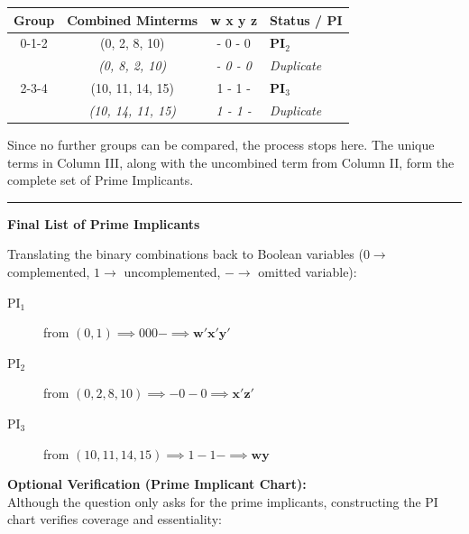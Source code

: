 \documentclass[12pt,a3paper]{article}
\begin{document}
\begin{enumerate}
\begin{tcolorbox}[enhanced,breakable,ansbox,colback=cC!4,colframe=cC,boxrule=0.8pt,arc=5pt,title={\textbf{Answer}},fonttitle=\bfseries\color{white},colbacktitle=cC]
\begin{center}
\begin{tabular}{cccl}
\toprule
\textbf{Group} & \textbf{Combined Minterms} & \textbf{w x y z} & \textbf{Status / PI} \\
\midrule
0-1-2 & (0, 2, 8, 10) & - 0 - 0 & \textcolor{cC}{\textbf{PI$_2$}} \\
      & \textit{(0, 8, 2, 10)} & \textit{- 0 - 0} & \textit{Duplicate} \\
\midrule
2-3-4 & (10, 11, 14, 15) & 1 - 1 - & \textcolor{cC}{\textbf{PI$_3$}} \\
      & \textit{(10, 14, 11, 15)} & \textit{1 - 1 -} & \textit{Duplicate} \\
\bottomrule
\end{tabular}
\end{center}

Since no further groups can be compared, the process stops here. The unique terms in Column III, along with the uncombined term from Column II, form the complete set of Prime Implicants.

\vspace{1em}
\rule{\textwidth}{0.4pt}
\vspace{1em}

\textbf{\large Final List of Prime Implicants}

Translating the binary combinations back to Boolean variables ($0 \rightarrow$ complemented, $1 \rightarrow$ uncomplemented, $- \rightarrow$ omitted variable):

\begin{description}
    \item[\textcolor{cC}{PI$_1$}] from $(0, 1) \implies 0 0 0 - \implies \mathbf{w'x'y'}$
    \item[\textcolor{cC}{PI$_2$}] from $(0, 2, 8, 10) \implies - 0 - 0 \implies \mathbf{x'z'}$
    \item[\textcolor{cC}{PI$_3$}] from $(10, 11, 14, 15) \implies 1 - 1 - \implies \mathbf{wy}$
\end{description}

\vspace{0.5em}
\textbf{Optional Verification (Prime Implicant Chart):} \\
Although the question only asks for the prime implicants, constructing the PI chart verifies coverage and essentiality:


\end{tcolorbox}
\end{enumerate}
\end{document}
